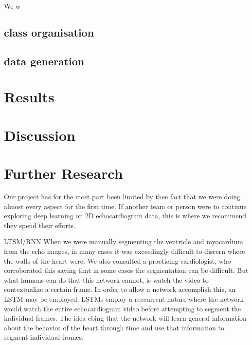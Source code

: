 \documentclass[12pt]{article}
\begin{document}
We w

\subsection{class organisation}
\subsection{data generation}



\section{Results}
\section{Discussion}
\section{Further Research}
Our project has for the most part been limited by thee fact that we were doing almost every aspect for the first time.
If another team or person were to continue exploring deep learning on 2D echocardiogram data, this is where we recommend they spend their efforts.

LTSM/RNN
When we were manually segmenting the ventricle and myocardium from the echo images, in many cases it was exceedingly difficult to discern where the walls of the heart were.
We also consulted a practicing cardiologist, who corroborated this saying that in some cases the segmentation can be difficult.
But what humans  can do that this network cannot, is watch the video to contextualize a certain frame.
In order to allow a network accomplish this, an LSTM may be employed.
LSTMs employ a reccurrent nature where the network would watch the entire echocardiogram video before attempting to segment the individual frames.
The idea ebing that the network will learn general information about the behavior of the heart through time and use that information to segment individual frames.
\end{document}
